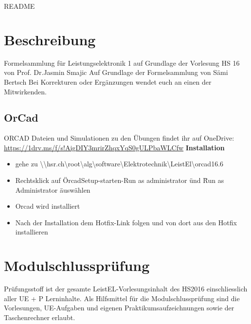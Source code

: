 \thispagestyle{empty}
\setcounter{page}{0} %
{\huge README }
\section*{Beschreibung}
Formelsammlung für Leistungselektronik 1 auf Grundlage der Vorlesung HS 16 von Prof. Dr.Jasmin Smajic \newline
Auf Grundlage der Formelsammlung von Sämi Bertsch\newline
Bei Korrekturen oder Ergänzungen wendet euch an einen der Mitwirkenden.
\subsection*{OrCad}
ORCAD Dateien und Simulationen zu den Übungen findet ihr auf OneDrive: \newline
\url{https://1drv.ms/f/s!AigDIY3mrirZhqxYqS0gULPbaWLCfw}\newline
\textbf{Installation}\newline
\begin{itemize}
    \item gehe zu  \textbackslash\textbackslash hsr.ch\textbackslash root\textbackslash alg\textbackslash software\textbackslash Elektrotechnik\textbackslash LeistEl\textbackslash orcad16.6
    \item Rechtsklick auf \" OrcadSetup-starten-Run as administrator \" und \" Run as Administrator \" auswählen
    \item Orcad wird installiert
    \item Nach der Installation dem Hotfix-Link folgen und von dort aus den Hotfix installieren
\end{itemize}

\section*{Modulschlussprüfung}
Prüfungsstoff ist der gesamte LeistEL-Vorlesungsinhalt des HS2016 einschliesslich aller UE + P Lerninhalte.\newline
Als Hilfsmittel für die Modulschlussprüfung sind die Vorlesungen,\newline
UE-Aufgaben und eigenen Praktikumsaufzeichnungen sowie der Taschenrechner erlaubt.

